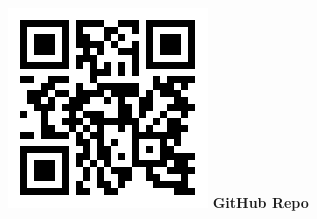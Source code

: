 \documentclass[a0paper,portrait,fontscale=0.395]{baposter}
\begin{document}
\begin{poster}
{\begin{minipage}[c]{0.4\linewidth}
\begin{minipage}[t]{0.285\linewidth}
    \includegraphics[height=\linewidth, valign=c]{dmriprep_github_dynamic_qr.png}
    \textbf{GitHub Repo}
    \end{minipage}
    \hfill\null
\end{minipage}
}





\end{poster}
\end{document}
